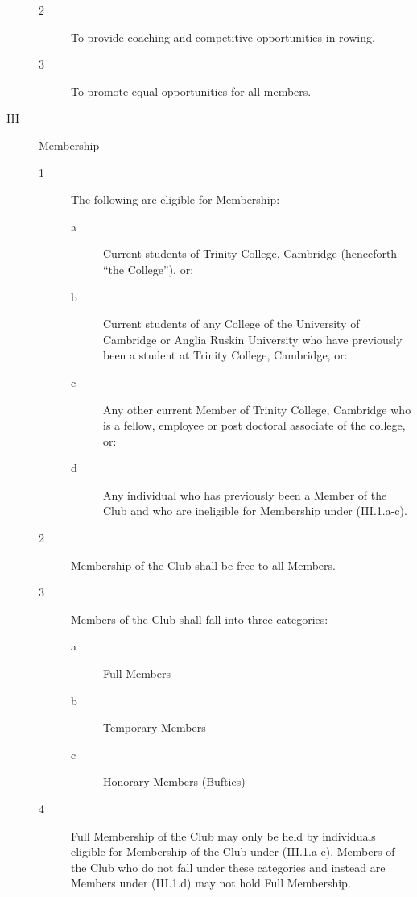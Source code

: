 \documentclass{article}
\begin{document}
\begin{description}
\begin{description}
		\item[2] To provide coaching and competitive opportunities in rowing.\\
		
		\item[3] To promote equal opportunities for all members.
	\end{description}

	\item[III] Membership
	
	\begin{description}
		\item[1] The following are eligible for Membership:
		\begin{description}
			\item[a] Current students of Trinity College, Cambridge (henceforth “the
			College”), or:\\
			
			\item[b] Current students of any College of the University of Cambridge or
			Anglia Ruskin University who have previously been a student at
			Trinity College, Cambridge, or:\\
			
			\item[c]  Any other current Member of Trinity College, Cambridge who is a
			fellow, employee or post doctoral associate of the college, or: \\
			
			\item[d] Any individual who has previously been a Member of the Club and
			who are ineligible for Membership under (III.1.a-c).
		\end{description}
	
	\item[2] Membership of the Club shall be free to all Members.\\
	
	\item[3] Members of the Club shall fall into three categories:
	\begin{description}
		\item[a] Full Members
		\item[b] Temporary Members
		\item[c] Honorary Members (Bufties)\\
	\end{description}

	\item[4] Full Membership of the Club may only be held by individuals eligible for
	Membership of the Club under (III.1.a-c). Members of the Club who do not
	fall under these categories and instead are Members under (III.1.d) may not
	hold Full Membership.
	

\end{description}
\end{description}
\end{document}

